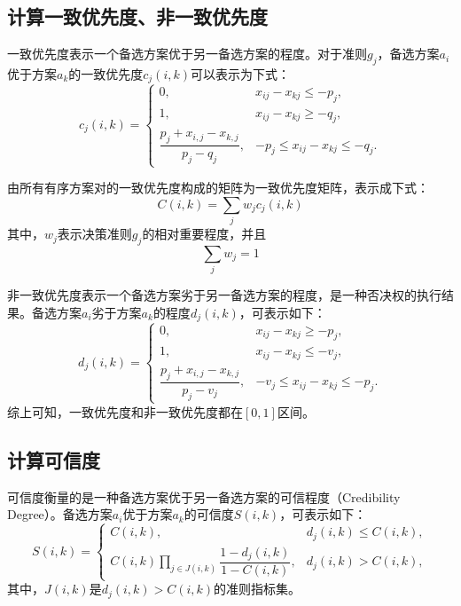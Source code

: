 \subsection{计算一致优先度、非一致优先度}
一致优先度表示一个备选方案优于另一备选方案的程度。对于准则$g_j$，备选方案$a_i$优于方案$a_k$的一致优先度$c_j(i,k)$可以表示为下式：
\begin{equation}\label{eq:consistent}
  c_j(i,k)=\left\{
           \begin{array}{ll}
             0, & x_{ij}-x_{kj}\le -p_j, \\
             1, & x_{ij}-x_{kj}\ge -q_j, \\
             \dfrac{p_j+x_{i,j}-x_{k,j}}{p_j-q_j}, & -p_j\le x_{ij}-x_{kj} \le  -q_j.
           \end{array}
          \right.
\end{equation}

由所有有序方案对的一致优先度构成的矩阵为一致优先度矩阵，表示成下式：
\[
 C(i,k) = \sum_j w_j c_j(i,k)
\]
其中，$w_j$表示决策准则$g_j$的相对重要程度，并且
\[\sum_j w_j =1\]

非一致优先度表示一个备选方案劣于另一备选方案的程度，是一种否决权的执行结果。备选方案$a_i$劣于方案$a_k$的程度$d_j(i,k)$，可表示如下：
\begin{equation}\label{eq:inconsistent}
  d_j(i,k)=\left\{
           \begin{array}{ll}
             0, & x_{ij}-x_{kj}\ge -p_j, \\
             1, & x_{ij}-x_{kj}\le -v_j, \\
             \dfrac{p_j+x_{i,j}-x_{k,j}}{p_j-v_j}, & -v_j\le x_{ij}-x_{kj} \le -p_j.
           \end{array}
          \right.
\end{equation}
综上可知，一致优先度和非一致优先度都在$[0,1]$区间。

\subsection{计算可信度}
可信度衡量的是一种备选方案优于另一备选方案的可信程度（Credibility Degree）。备选方案$a_i$优于方案$a_k$的可信度$S(i,k)$，可表示如下：
\begin{equation}\label{eq:credibility}
  S(i,k)=\left\{
           \begin{array}{ll}
             C(i,k), & d_j(i,k)\le C(i,k),\\
             C(i,k)\prod \limits_{j\in J(i,k)}\dfrac{1-d_j(i,k)}{1-C(i,k)}, & d_j(i,k) > C(i,k),
           \end{array}
          \right.
\end{equation}
其中，$J(i,k)$是$d_j(i,k)>C(i,k)$的准则指标集。

